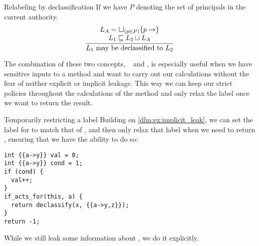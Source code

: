 \begin{definition}{Relabeling by declassification}
  If we have $P$ denoting the set of principals in the current authority.
  \[
  \frac{
  \begin{array}{c}
    L_A = \mathlarger{\mathlarger\sqcup}_{(p \in P)} \{p \rightarrow \} \\
    L_1 \sqsubseteq L_2 \sqcup L_A
  \end{array}
  }
  {L_1 \text{ may be declassified to } L_2}
  \]
\end{definition}

The combination of these two concepts, \dlmactsfor~ and \dlmdeclassify, is especially useful when we have sensitive inputs to a method and want to carry out our calculations without the fear of neither explicit or implicit leakage.
This way we can keep our strict policies throughout the calculations of the method and only relax the label once we want to return the result.

\begin{example}{Temporarily restricting a label}
  Building on \cref{dlm:ex:implicit_leak}, we can set the label for  to match that of , and then only relax that label when we need to return , ensuring that we have the ability to do so:
  \begin{lstlisting}[style=dlmc]
int {{a->y}} val = 0;
int {{a->y}} cond = 1;
if (cond) {
  val++;
}
if_acts_for(this, a) {
  return declassify(x, {{a->y,z}});
}
return -1;
  \end{lstlisting}
  While we still leak some information about , we do it explicitly.
\end{example}
